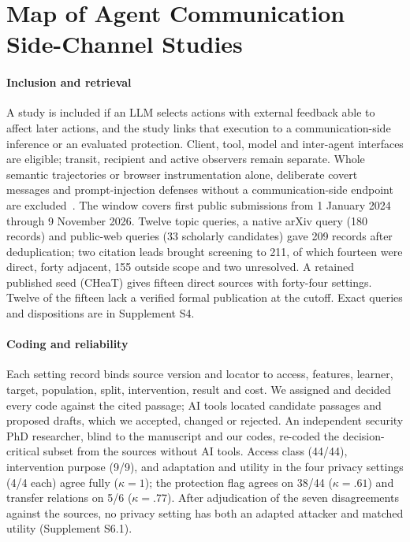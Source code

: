 \appendices
\section{Map of Agent Communication Side-Channel Studies}\label{app:map}
\paragraph{Inclusion and retrieval}
A study is included if an LLM selects actions with external feedback able to affect later actions, and the study links that execution to a communication-side inference or an evaluated protection. Client, tool, model and inter-agent interfaces are eligible; transit, recipient and active observers remain separate. Whole semantic trajectories or browser instrumentation alone, deliberate covert messages and prompt-injection defenses without a communication-side endpoint are excluded~\cite{yao2026intentminer,uitraces2026}. The window covers first public submissions from 1 January 2024 through 9 November 2026. Twelve topic queries, a native arXiv query (180 records) and public-web queries (33 scholarly candidates) gave 209 records after deduplication; two citation leads brought screening to 211, of which fourteen were direct, forty adjacent, 155 outside scope and two unresolved. A retained published seed (CHeaT) gives fifteen direct sources with forty-four settings. Twelve of the fifteen lack a verified formal publication at the cutoff. Exact queries and dispositions are in Supplement S4.

\paragraph{Coding and reliability}
Each setting record binds source version and locator to access, features, learner, target, population, split, intervention, result and cost. We assigned and decided every code against the cited passage; AI tools located candidate passages and proposed drafts, which we accepted, changed or rejected. An independent security PhD researcher, blind to the manuscript and our codes, re-coded the decision-critical subset from the sources without AI tools. Access class (44/44), intervention purpose (9/9), and adaptation and utility in the four privacy settings (4/4 each) agree fully ($\kappa=1$); the protection flag agrees on 38/44 ($\kappa=.61$) and transfer relations on 5/6 ($\kappa=.77$). After adjudication of the seven disagreements against the sources, no privacy setting has both an adapted attacker and matched utility (Supplement S6.1).

